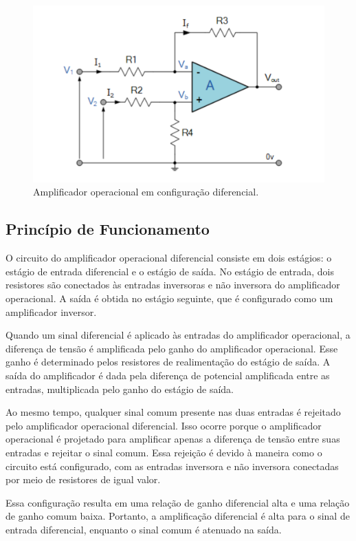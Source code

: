 \documentclass[12pt,twoside, a4paper, twocolumn]{article}
\begin{document}
\begin{figure}[h]
    \centering
    \includegraphics[width=1\columnwidth]{images/opamp_diferencial.png}
    \caption{Amplificador operacional em configuração diferencial.}
\end{figure}


\subsection{Princípio de Funcionamento}


O circuito do amplificador operacional diferencial consiste em dois estágios: o estágio de entrada diferencial e o estágio de saída. No estágio de entrada, dois resistores são conectados às entradas inversoras e não inversora do amplificador operacional. A saída é obtida no estágio seguinte, que é configurado como um amplificador inversor.


Quando um sinal diferencial é aplicado às entradas do amplificador operacional, a diferença de tensão é amplificada pelo ganho do amplificador operacional. Esse ganho é determinado pelos resistores de realimentação do estágio de saída. A saída do amplificador é dada pela diferença de potencial amplificada entre as entradas, multiplicada pelo ganho do estágio de saída.


Ao mesmo tempo, qualquer sinal comum presente nas duas entradas é rejeitado pelo amplificador operacional diferencial. Isso ocorre porque o amplificador operacional é projetado para amplificar apenas a diferença de tensão entre suas entradas e rejeitar o sinal comum. Essa rejeição é devido à maneira como o circuito está configurado, com as entradas inversora e não inversora conectadas por meio de resistores de igual valor.


Essa configuração resulta em uma relação de ganho diferencial alta e uma relação de ganho comum baixa. Portanto, a amplificação diferencial é alta para o sinal de entrada diferencial, enquanto o sinal comum é atenuado na saída.
\end{document}
